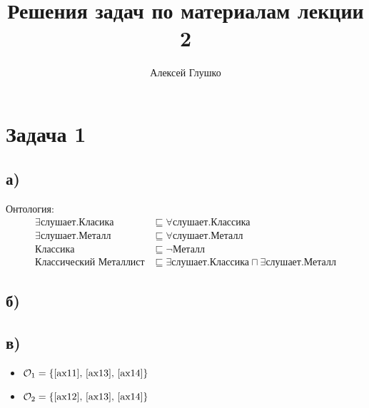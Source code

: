 \documentclass[11pt]{article}
\title{Решения задач по материалам лекции 2}
\author{Алексей Глушко}
\theoremstyle{definition}
\theoremstyle{lemma}
\theoremstyle{statement}
\newcommand{\hsomet}[2]{\hsome{\textit{#1}}{\textbf{#2}}}
\newcommand{\hsome}[2]{\exists#1.#2}
\newcommand{\honlyt}[2]{\honly{\textit{#1}}{\textbf{#2}}}
\newcommand{\honly}[2]{\forall#1.#2}
\newcommand{\his}{\sqsubseteq}
\newcommand{\hand}{\sqcap}
\begin{document}
\maketitle
\section*{Задача 1}
    \subsection*{а)}
        Онтология:
        \begin{align}
            \hsomet{слушает}{Класика} &\his \honlyt{слушает}{Классика} \label{ax11} \\
            \hsomet{слушает}{Металл} &\his \honlyt{слушает}{Металл} \label{ax12} \\
            \textbf{Классика} &\his \neg \textbf{Металл} \label{ax13} \\
            \textbf{Классический Металлист} &\his \hsomet{слушает}{Классика} \hand \hsomet{слушает}{Металл} \label{ax14}
        \end{align}

    \subsection*{б)}
        \begin{figure}[H]
            \centering
        \end{figure}

    \subsection*{в)}
        \begin{itemize}
            \item $\mathcal{O}_1 = \{\text{\ref{ax11}, \ref{ax13}, \ref{ax14}}\}$
            \item $\mathcal{O}_2 = \{\text{\ref{ax12}, \ref{ax13}, \ref{ax14}}\}$
        \end{itemize}
\end{document}
